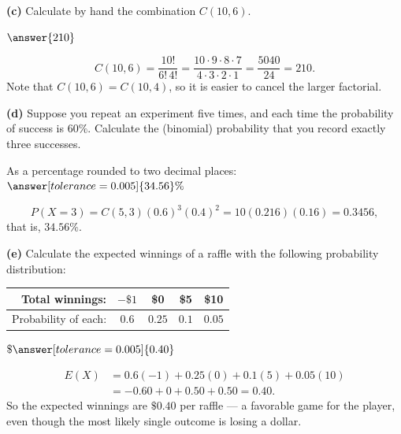 \documentclass[12pt]{ximera}
\begin{document}
\begin{problem}
\begin{prompt}
\textbf{(c)} Calculate by hand the combination $C(10,6)$.

$\answer{210}$

\begin{feedback}
\[
C(10,6)=\frac{10!}{6!\,4!}
=\frac{10\cdot 9\cdot 8\cdot 7}{4\cdot 3\cdot 2\cdot 1}
=\frac{5040}{24}=210.
\]
Note that $C(10,6)=C(10,4)$, so it is easier to cancel the larger factorial.
\end{feedback}
\end{prompt}

\begin{prompt}
\textbf{(d)} Suppose you repeat an experiment five times, and each time the
probability of success is $60\%$. Calculate the (binomial) probability that you record
exactly three successes.

As a percentage rounded to two decimal places: $\answer[tolerance=0.005]{34.56}\%$

\begin{feedback}
\[
P(X=3)=C(5,3)(0.6)^3(0.4)^2 = 10(0.216)(0.16) = 0.3456,
\]
that is, $34.56\%$.
\end{feedback}
\end{prompt}

\begin{prompt}
\textbf{(e)} Calculate the expected winnings of a raffle with the following
probability distribution:

\begin{center}
\begin{tabular}{|r|c|c|c|c|}\hline
Total winnings: & $-\$1$ & \$0 & \$5 & \$10 \\\hline
Probability of each: & $0.6$ & $0.25$ & $0.1$ & $0.05$ \\\hline
\end{tabular}
\end{center}

$\$\answer[tolerance=0.005]{0.40}$

\begin{feedback}
\begin{align*}
E(X) &= 0.6(-1) + 0.25(0) + 0.1(5) + 0.05(10)\\
     &= -0.60 + 0 + 0.50 + 0.50 = 0.40.
\end{align*}
So the expected winnings are $\$0.40$ per raffle --- a favorable game for the player,
even though the most likely single outcome is losing a dollar.
\end{feedback}
\end{prompt}
\end{problem}
\end{document}
